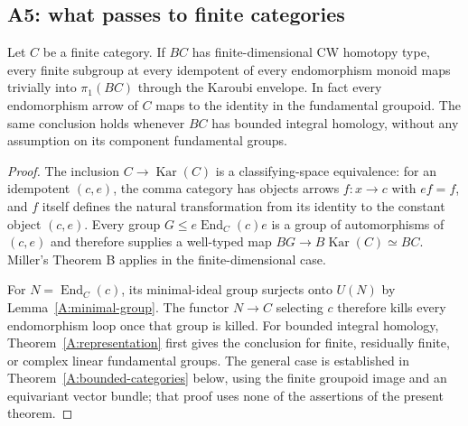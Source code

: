 \subsection{A5: what passes to finite categories}

\begin{theorem}\label{A:categories}
Let $C$ be a finite category. If $BC$ has finite-dimensional CW homotopy
type, every finite subgroup at every idempotent of every endomorphism monoid
maps trivially into $\pi_1(BC)$ through the Karoubi envelope. In fact every
endomorphism arrow of $C$ maps to the identity in the fundamental groupoid.
The same conclusion holds whenever $BC$ has bounded integral homology,
without any assumption on its component fundamental groups.
\end{theorem}
\begin{proof}
The inclusion $C\to\operatorname{Kar}(C)$ is a classifying-space equivalence:
for an idempotent $(c,e)$, the comma category has objects arrows
$f:x\to c$ with $ef=f$, and $f$ itself defines the natural transformation
from its identity to the constant object $(c,e)$. Every group
$G\leq e\operatorname{End}_C(c)e$ is a group of automorphisms of $(c,e)$ and
therefore supplies a well-typed map $BG\to B\operatorname{Kar}(C)\simeq BC$.
Miller's Theorem B applies in the finite-dimensional case.

For $N=\operatorname{End}_C(c)$, its minimal-ideal group surjects onto
$U(N)$ by Lemma~\ref{A:minimal-group}. The functor $N\to C$ selecting $c$
therefore kills every endomorphism loop once that group is killed.
For bounded integral homology, Theorem~\ref{A:representation} first gives
the conclusion for finite, residually finite, or complex linear fundamental
groups. The general case is established in
Theorem~\ref{A:bounded-categories} below, using the finite groupoid image
and an equivariant vector bundle; that proof uses none of the assertions
of the present theorem.
\end{proof}

